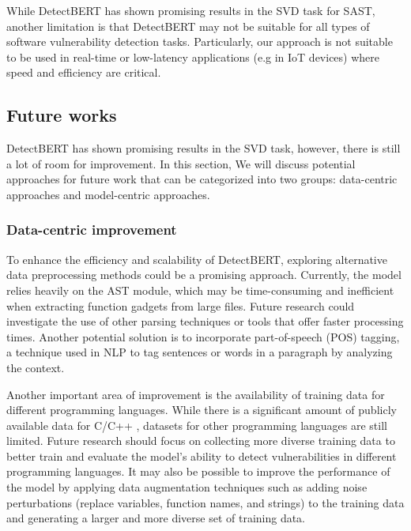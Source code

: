 \documentclass{ieeeaccess}
\begin{document}
\par While DetectBERT has shown promising results in the  SVD  task for SAST,  another limitation is that DetectBERT may not be suitable for all types of software vulnerability detection tasks. Particularly, our approach is not suitable to be used in real-time or low-latency applications (e.g in IoT devices) where speed and efficiency are critical.

\label{sec:con1}



\subsection{Future works}
\label{sec:con3}
DetectBERT has shown promising results in the SVD task, however, there is  still a lot of room for improvement. In this section,  We will discuss potential approaches for future work that can be categorized into two groups: data-centric approaches and model-centric approaches.
\subsubsection{Data-centric improvement}

\par To enhance the efficiency and scalability of DetectBERT, exploring alternative data preprocessing methods could be a promising approach. Currently, the model relies heavily on the AST module, which may be time-consuming and inefficient when extracting function gadgets from large files. Future research could investigate the use of other parsing techniques or tools that offer faster processing times. Another potential solution is to incorporate part-of-speech (POS) tagging, a technique used in NLP to tag sentences or words in a paragraph by analyzing the context. 

\par Another important area of improvement is the availability of training data for different programming languages. While there is a significant amount of publicly available data for C/C++ \cite{sard, devign, SATE, Draper, Are, Linevd, nvd}, datasets for other programming languages are still limited. Future research should focus on collecting more diverse training data to better train and evaluate the model's ability to detect vulnerabilities in different programming languages. It may also be possible to improve the performance of the model by applying data augmentation techniques such as adding noise perturbations  (replace variables, function names, and strings) to the training data and generating a larger and more diverse set of training data.
\end{document}
